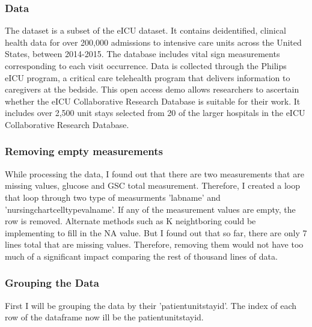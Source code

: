 \documentclass{article}
\begin{document}
\subsubsection{Data}
The dataset is a subset of the eICU dataset. It
contains deidentified, clinical health data for over 200,000 admissions to intensive care units across
the United States, between 2014-2015. The database includes vital sign measurements corresponding
to each visit occurrence. Data is collected through the Philips eICU program, a critical care telehealth
program that delivers information to caregivers at the bedside. This open access demo allows
researchers to ascertain whether the eICU Collaborative Research Database is suitable for their work.
It includes over 2,500 unit stays selected from 20 of the larger hospitals in the eICU Collaborative
Research Database.
\subsubsection{Removing empty measurements}
While processing the data, I found out that there are two measurements that are missing values, glucose and GSC total measurement. Therefore, I created a loop that loop through two type of measurments 'labname' and 'nursingchartcelltypevalname'. If any of the measurement values are empty, the row is removed. Alternate methods such as K neightboring could be implementing to fill in the NA value. But I found out that so far, there are only 7 lines total that are missing values. Therefore, removing them would not have too much of a significant impact comparing the rest of thousand lines of data. 
\subsubsection{Grouping the Data}
First I will be grouping the data by their 'patientunitstayid'. The index of each row of the dataframe now ill be the patientunitstayid.
\end{document}
